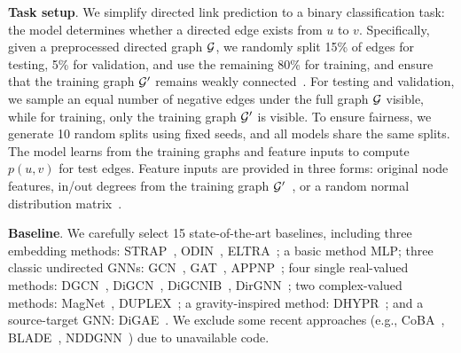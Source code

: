 \textbf{Task setup}. %
We simplify directed link prediction to a binary classification task: the model determines whether a directed edge exists from $u$ to $v$. 
Specifically, given a preprocessed directed graph ${\mathcal{G}}$, we randomly split 15\% of edges for testing, 5\% for validation, and use the remaining 80\% for training, and ensure that the training graph ${\mathcal{G}}^{\prime}$ remains weakly connected~\cite{dpyg}. For testing and validation, we sample an equal number of negative edges under the full graph ${\mathcal{G}}$ visible, while for training, only the training graph ${\mathcal{G}}^{\prime}$ is visible. To ensure fairness, we generate 10 random splits using fixed seeds, and all models share the same splits. The model learns from the training graphs and feature inputs to compute $p(u, v)$ for test edges.
Feature inputs are provided in three forms: original node features, in/out degrees from the training graph ${\mathcal{G}}^{\prime}$~\cite{magnet}, or a random normal distribution matrix~\cite{duplex}.

\textbf{Baseline}. We carefully select 15 state-of-the-art baselines, including three embedding methods: STRAP~\cite{strap}, ODIN~\cite{odin}, ELTRA~\cite{eltra}; a basic method MLP; three classic undirected GNNs: GCN~\cite{gcn}, GAT~\cite{gat}, APPNP~\cite{appnp}; four single real-valued methods: DGCN~\cite{dgcn-tong}, DiGCN~\cite{digcn}, DiGCNIB~\cite{digcn}, DirGNN~\cite{dirgnn}; two complex-valued methods: MagNet~\cite{magnet}, DUPLEX~\cite{duplex}; a gravity-inspired method: DHYPR~\cite{dhypr}; and a source-target GNN: DiGAE~\cite{digae}. We exclude some recent approaches (e.g., CoBA~\cite{coba}, BLADE~\cite{blade}, NDDGNN~\cite{nddgnn}) due to unavailable code.


